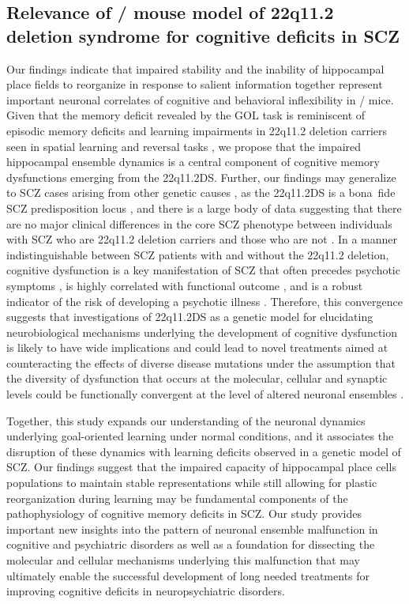 \subsection{Relevance of \df/ mouse model of 22q11.2 deletion syndrome for cognitive deficits in SCZ}

Our findings indicate that impaired stability and the inability of hippocampal place fields to reorganize in response to salient information together represent important neuronal correlates of cognitive and behavioral inflexibility in \df/ mice.  Given that the memory deficit revealed by the GOL task is reminiscent of episodic memory deficits and learning impairments in 22q11.2 deletion carriers \citep{McCabe2011} seen in spatial learning \citep{Hanlon2006, Wilkins2013} and reversal tasks \citep{Debbane2008b, Leeson2009}, we propose that the impaired hippocampal ensemble dynamics is a central component of cognitive memory dysfunctions emerging from the 22q11.2DS.  Further, our findings may generalize to SCZ cases arising from other genetic causes \citep{Rodriguez-Murillo2012}, as the 22q11.2DS is a bona~fide SCZ predisposition locus \citep{Marshall2016},  and there is a large body of data suggesting that there are no major clinical differences in the core SCZ phenotype between individuals with SCZ who are 22q11.2 deletion carriers and those who are not \citep{Bassett2003, Bassett1998}. In a manner indistinguishable between SCZ patients with and without the 22q11.2 deletion, cognitive dysfunction is a key manifestation of SCZ that often precedes psychotic symptoms \citep{Larson2010, Reichenberg2010, Seidman2010}, is highly correlated with functional outcome \citep{Green2004, Kahn2013, Rosenheck2006}, and is a robust indicator of the risk of developing a psychotic illness \citep{Butcher2012, Goldenberg2012, Schneider2014, Vorstman2015}. Therefore, this convergence suggests that investigations of 22q11.2DS as a genetic model for elucidating neurobiological mechanisms underlying the development of cognitive dysfunction is likely to have wide implications and could lead to novel treatments aimed at counteracting the effects of diverse disease mutations under the assumption that the diversity of dysfunction that occurs at the molecular, cellular and synaptic levels could be functionally convergent at the level of altered  neuronal ensembles \citep{Crabtree2014, Lisman2012, Mukai2015}.

Together, this study expands our understanding of the neuronal dynamics underlying goal-oriented learning under normal conditions, and it associates the disruption of these dynamics with learning deficits observed in a genetic model of SCZ. Our findings suggest that the impaired capacity of hippocampal place cells populations to maintain stable representations while still allowing for plastic reorganization during learning may be fundamental components of the pathophysiology of cognitive memory deficits in SCZ. Our study provides important new insights into the pattern of neuronal ensemble malfunction in cognitive and psychiatric disorders as well as a foundation for dissecting the molecular and cellular mechanisms underlying this malfunction that may ultimately enable the successful development of long needed treatments for improving cognitive deficits in neuropsychiatric disorders.

